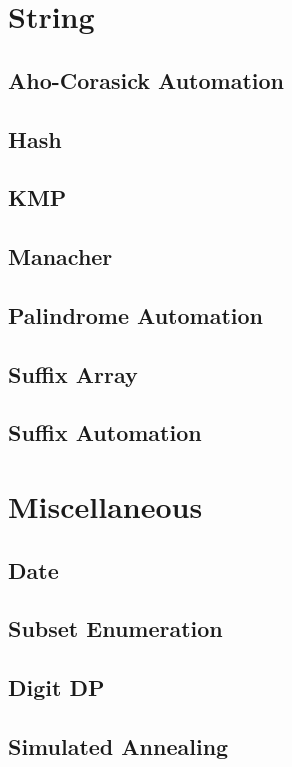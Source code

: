 \section{String}
\subsection{Aho-Corasick Automation}
\raggedbottom
\hrulefill
\subsection{Hash}
\raggedbottom
\hrulefill
\subsection{KMP}
\raggedbottom
\hrulefill
\subsection{Manacher}
\raggedbottom
\hrulefill
\subsection{Palindrome Automation}
\raggedbottom
\hrulefill
\subsection{Suffix Array}
\raggedbottom
\hrulefill
\subsection{Suffix Automation}
\raggedbottom
\hrulefill

\section{Miscellaneous}
\subsection{Date}
\raggedbottom
\hrulefill
\subsection{Subset Enumeration}
\raggedbottom
\hrulefill
\subsection{Digit DP}
\raggedbottom
\hrulefill
\subsection{Simulated Annealing}
\raggedbottom
\hrulefill
